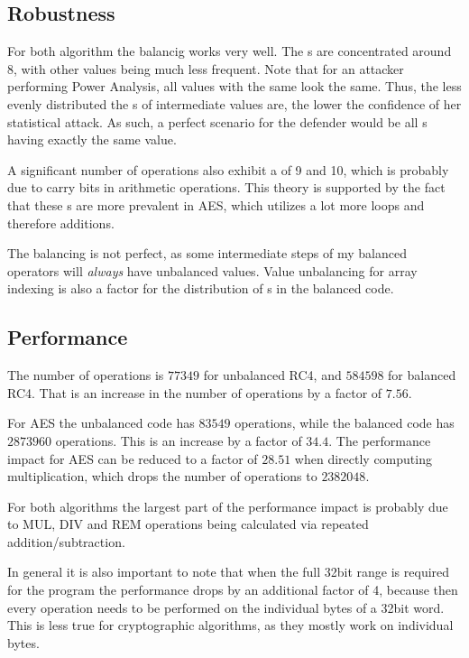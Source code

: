 \subsection{Robustness}
For both algorithm the balancig works very well.
The \hammingw{}s are concentrated around 8, with other values being much less frequent.
Note that for an attacker performing Power Analysis, all values with the same \hammingw{} look the same.
Thus, the less evenly distributed the \hammingw{}s of intermediate values are, the lower the confidence of her statistical attack.
As such, a perfect scenario for the defender would be all \hammingw{}s having exactly the same value.

A significant number of operations also exhibit a \hammingw{} of 9 and 10, which is probably due to carry bits in arithmetic operations.
This theory is supported by the fact that these \hammingw{}s are more prevalent in AES, which utilizes a lot more loops and therefore additions.

The balancing is not perfect, as some intermediate steps of my balanced operators will \emph{always} have unbalanced values.
Value unbalancing for array indexing is also a factor for the distribution of \hammingw{}s in the balanced code.

\subsection{Performance}
The number of operations is $77349$ for unbalanced RC4, and $584598$ for balanced RC4.
That is an increase in the number of operations by a factor of $7.56$.

For AES the unbalanced code has $83549$ operations, while the balanced code has $2873960$ operations.
This is an increase by a factor of $34.4$.
The performance impact for AES can be reduced to a factor of $28.51$ when directly computing multiplication, which drops the number of operations to $2382048$.

For both algorithms the largest part of the performance impact is probably due to MUL, DIV and REM operations being calculated via repeated addition/subtraction.

In general it is also important to note that when the full 32bit range is required for the program the performance drops by an additional factor of 4, because then every operation needs to be performed on the individual bytes of a 32bit word.
This is less true for cryptographic algorithms, as they mostly work on individual bytes.
